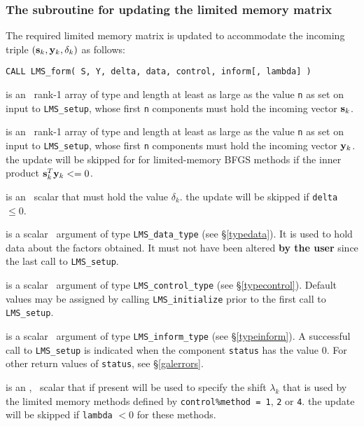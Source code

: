 \documentclass{galahad}
\newcommand{\packagename}{LMS}
\begin{document}

\subsubsection{The subroutine for updating the limited memory matrix}
The required limited memory matrix is updated to accommodate the
incoming triple $({\mathbf{s}}_k,{\mathbf{y}}_k,\delta_k)$ as follows:
\vspace*{1mm}

\hspace{8mm}
{\tt CALL \packagename\_form( S, Y, delta, data, control, inform[, lambda] )}

\vspace*{-3mm}
\begin{description}
 is an \intentin\ rank-1 array of type \realdp and length at
least as large as the value {\tt n} as set on input to
{\tt \packagename\_setup}, whose first {\tt n} components must hold the
incoming vector ${\mathbf{s}}_k$.

 is an \intentin\ rank-1 array of type \realdp and length at
least as large as the value {\tt n} as set on input to
{\tt \packagename\_setup}, whose first {\tt n} components must hold the
incoming vector ${\mathbf{y}}_k$.
\restriction the update will be skipped for for limited-memory BFGS methods
if the inner product ${\mathbf{s}}_k^T {\mathbf{y}}_k <= 0$.

 is an \intentin\ \realdp scalar that must hold the value $\delta_k$.
\restriction the update will be skipped if {\tt delta} $\leq 0$.

 is a scalar \intentinout\ argument of type
{\tt \packagename\_data\_type}
(see \S\ref{typedata}). It is used to hold data about the factors obtained.
It must not have been altered {\bf by the user} since the last call to
{\tt \packagename\_setup}.

 is a scalar \intentin\ argument of type
{\tt \packagename\_control\_type}
(see \S\ref{typecontrol}). Default values may be assigned by calling
{\tt \packagename\_initialize} prior to the first call to
{\tt \packagename\_setup}.

 is a scalar \intentout\ argument of type
{\tt \packagename\_inform\_type}
(see \S\ref{typeinform}). A successful call to
{\tt \packagename\_setup}
is indicated when the  component {\tt status} has the value 0.
For other return values of {\tt status}, see \S\ref{galerrors}.

 is an \optional, \intentin\ \realdp scalar that if present
will be used to specify the shift $\lambda_k$ that is used by the
limited memory methods defined by
{\tt control\%method = 1}, {\tt 2} or {\tt 4}.
\restriction the update will be skipped if {\tt lambda} $< 0$
for these methods.

\end{description}
\end{document}
